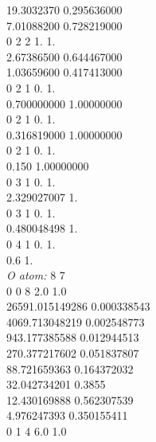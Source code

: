 \documentclass[11pt,DIV=13,BCOR=5mm,a4paper,headinclude]{scrbook}
\begin{document}
\begin{spacing}{0.5}
{       19.3032370         0.295636000\\
       
       7.01088200         0.728219000\\
0 2 2 1. 1.\\
       
       2.67386500         0.644467000\\
       
       1.03659600         0.417413000\\
0 2 1 0. 1.\\
      
      0.700000000          1.00000000\\
0 2 1 0. 1.\\
      
      0.316819000          1.00000000\\
0 2 1 0. 1.\\
      
      0.150          1.00000000\\
0  3  1  0.  1.\\
      
      2.329027007      1.\\
0  3  1  0.  1.\\
      
      0.480048498      1.\\
0  4  1  0.  1.\\
      
      0.6      1.\\
      
\textit{O atom: } 
8 7\\
0 0 8 2.0 1.0\\

26591.015149286   0.000338543\\

4069.713048219    0.002548773\\

943.177385588     0.012944513\\

270.377217602     0.051837807\\

88.721659363      0.164372032\\

32.042734201      0.3855\\

12.430169888      0.562307539\\

4.976247393       0.350155411\\
0 1 4 6.0 1.0\\

}
\end{spacing}
\end{document}
